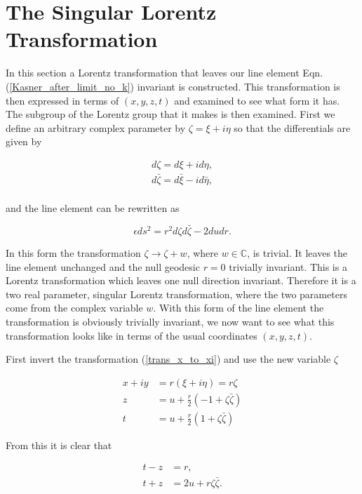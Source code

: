 \section{The Singular Lorentz Transformation}

In this section a Lorentz transformation that leaves our line element Eqn.(\ref{Kasner_after_limit_no_k}) invariant is constructed. This transformation is then expressed in terms of $(x,y,z,t)$ and examined to see what form it has. The subgroup of the Lorentz group that it makes is then examined. First we define an arbitrary complex parameter by $\zeta = \xi + i \eta$ so that the differentials are given by

\begin{eqnarray*}
d\zeta = {d\xi} + i {d\eta}, \\
d\bar{\zeta} = {d\bar{\xi}} - i {d\bar{\eta}}, \\
\end{eqnarray*}

\noindent and the line element can be rewritten as

\begin{equation*}
\epsilon {ds^2} = r^2 {d\zeta}{d\bar{\zeta}} - 2 {du}{dr}.
\end{equation*}

\noindent In this form the transformation $\zeta \rightarrow \zeta + w$, where $w \in \mathbb{C}$, is trivial. It leaves the line element unchanged and the null geodesic $r = 0$ trivially invariant. This is a Lorentz transformation which leaves one null direction invariant. Therefore it is a two real parameter, singular Lorentz transformation, where the two parameters come from the complex variable $w$. With this form of the line element the transformation is obviously trivially invariant, we now want to see what this transformation looks like in terms of the usual coordinates $(x,y,z,t)$.

First invert the transformation (\ref{trans_x_to_xi}) and use the new variable $\zeta$

\begin{align} \nonumber
x + iy  & = r (\xi + i \eta) = r \zeta \\\nonumber
z  & = u + \frac{r}{2}(-1 + \zeta \bar{\zeta}) \\\label{Singular_Trans_x,y,z,t_xi,eta,r,u_first}
t &  = u + \frac{r}{2}(1 + \zeta \bar{\zeta})
\end{align}

\noindent From this it is clear that

\begin{align*}
t - z & = r, \\
t + z & = 2 u + r \zeta \bar{\zeta}. 
\end{align*}

